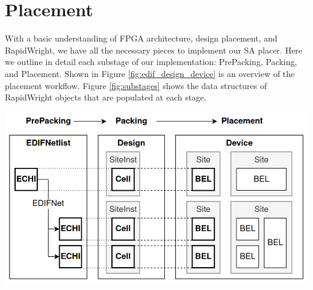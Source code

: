 
\section{Placement}
\label{sec:simulated_annealing}
With a basic understanding of FPGA architecture, design placement, and RapidWright, we have all the necessary pieces to implement our SA placer. 
Here we outline in detail each substage of our implementation: PrePacking, Packing, and Placement. 
Shown in Figure \ref{fig:edif_design_device} is an overview of the placement workflow. 
Figure \ref{fig:substages} shows the data structures of RapidWright objects that are populated at each stage. 

{
    \centering
    \includegraphics[width=0.9\columnwidth]{figures/edif_design_device.png}
    \label{fig:edif_design_device}
}

